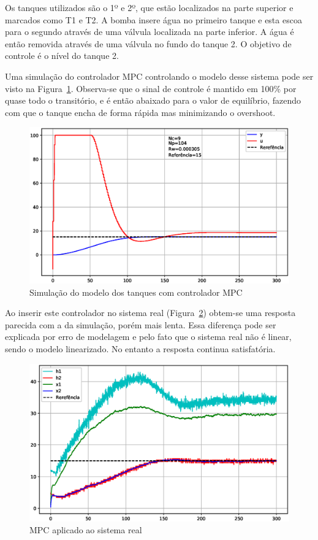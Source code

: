 Os tanques utilizados são o 1º e 2º, que estão localizados na parte superior e
marcados como T1 e T2. A bomba insere água no primeiro tanque e esta escoa para
o segundo através de uma válvula localizada na parte inferior. A água é então
removida através de uma válvula no fundo do tanque 2. O objetivo de controle é
o nível do tanque 2.

Uma simulação do controlador MPC controlando o modelo desse sistema pode ser
visto na Figura~\ref{fig:mpc-simulated}. Observa-se que o sinal de controle é
mantido em 100\% por quase todo o transitório, e é então abaixado para o valor
de equilíbrio, fazendo com que o tanque encha de forma rápida mas minimizando o
overshoot.

\begin{figure}[ht!]
	\centering
	\captionsetup{justification=centering}
	\includegraphics[height=0.5\linewidth]{imgs/mpc-simulado}
	\caption{Simulação do modelo dos tanques com controlador MPC}%
	\label{fig:mpc-simulated}
\end{figure}

Ao inserir este controlador no sistema real (Figura~\ref{fig:mpc-tanks})
obtem-se uma resposta parecida com a da simulação, porém mais lenta. Essa
diferença pode ser explicada por erro de modelagem e pelo fato que o sistema
real não é linear, sendo o modelo linearizado. No entanto a resposta continua
satisfatória.

\begin{figure}[ht!]
	\centering
	\captionsetup{justification=centering}
	\includegraphics[height=0.5\linewidth]{imgs/mpc-tanque}
	\caption{MPC aplicado ao sistema real}%
	\label{fig:mpc-tanks}
\end{figure}

